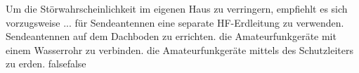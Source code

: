     {Um die Störwahrscheinlichkeit im eigenen Haus zu verringern, empfiehlt es sich vorzugsweise ...}
    {für Sendeantennen eine separate HF-Erdleitung zu verwenden.}
    {Sendeantennen auf dem Dachboden zu errichten.}
    {die Amateurfunkgeräte mit einem Wasserrohr zu verbinden.}
    {die Amateurfunkgeräte mittels des Schutzleiters zu erden.}
    {false}{false}